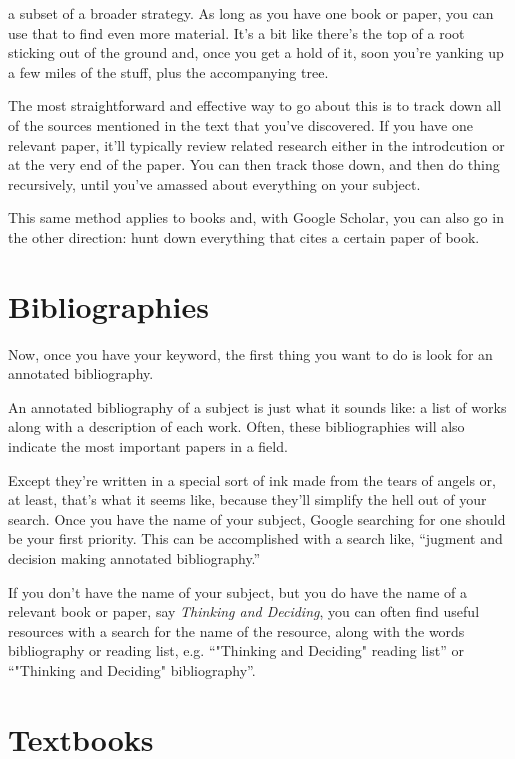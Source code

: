  a subset of a broader strategy. As long as you have one
book or paper, you can use that to find even more material. It's a bit like
there's the top of a root sticking out of the ground and, once you get a hold of
it, soon you're yanking up a few miles of the stuff, plus the accompanying tree.

The most straightforward and effective way to go about this is to track down all
of the sources mentioned in the text that you've discovered. If you have one
relevant paper, it'll typically review related research either in the
introdcution or at the very end of the paper. You can then track those down, and
then do thing recursively, until you've amassed about everything on your
subject.

This same method applies to books and, with Google Scholar, you can also go in
the other direction: hunt down everything that cites a certain paper of book.

\section{Bibliographies}

Now, once you have your keyword, the first thing you want to do is look for an
annotated bibliography.

An annotated bibliography of a subject is just what it sounds like: a list of
works along with a description of each work. Often, these bibliographies will
also indicate the most important papers in a field.

Except they're written in a special sort of ink made from the tears of angels
or, at least, that's what it seems like, because they'll simplify the hell out
of your search.  Once you have the
name of your subject, Google searching for one should be your first
priority. This can be accomplished with a search like, ``jugment and decision
making annotated bibliography.''

If you don't have the name of your subject, but you do have the name of a
relevant book or paper, say \textit{Thinking and Deciding}, you can often find useful resources with a search
for the name of the resource, along with the words bibliography or reading list,
e.g. ``"Thinking and Deciding" reading list'' or ``"Thinking and Deciding"
bibliography''.

\section{Textbooks}

